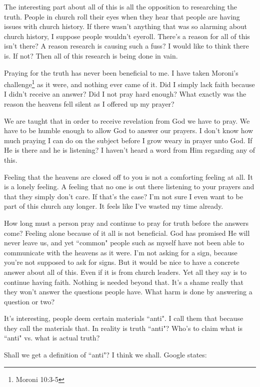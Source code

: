 The interesting part about all of this is all the opposition to researching the
truth. People in church roll their eyes when they hear that people are having
issues with church history. If there wasn't anything that was so alarming
about church history, I suppose people wouldn't eyeroll. There's a reason for
all of this isn't there? A reason research is causing such a fuss? I would like
to think there is. If not? Then all of this research is being done in vain.

Praying for the truth has never been beneficial to me. I have taken Moroni's
challenge\footnote{Moroni 10:3-5} as it were, and nothing ever came of it. 
Did I simply lack faith because I didn't receive an answer? Did I not pray hard 
enough? What exactly was the reason the heavens fell silent as I offered up 
my prayer?

We are taught that in order to receive revelation from God we have to pray.
We have to be humble enough to allow God to answer our prayers. I don't know how
much praying I can do on the subject before I grow weary in prayer unto God. If
He is there and he is listening? I haven't heard a word from Him regarding any
of this.

Feeling that the heavens are closed off to you is not a comforting feeling at
all. It is a lonely feeling. A feeling that no one is out there listening to
your prayers and that they simply don't care. If that's the case? I'm not sure I
even want to be part of this church any longer. It feels like I've wasted my
time already.

How long must a person pray and continue to pray for truth before the answers
come? Feeling alone because of it all is not beneficial. God has promised He
will never leave us, and yet ``common" people such as myself have not been able
to communicate with the heavens as it were. I'm not asking for a sign, because
you're not supposed to ask for signs. But it would be nice to have a concrete
answer about all of this. Even if it is from church leaders. Yet all they say is
to continue having faith. Nothing is needed beyond that. It's a shame really
that they won't answer the questions people have. What harm is done by answering
a question or two?

It's interesting, people deem certain materials ``anti". I call them that 
because they call the materials that. In reality is truth ``anti"? Who's to 
claim what is ``anti" vs. what is actual truth?

Shall we get a definition of ``anti"? I think we shall. Google states:

